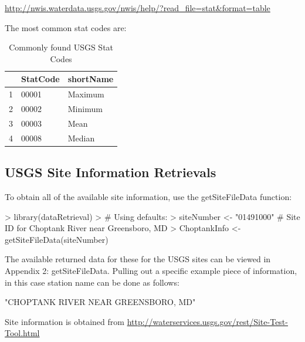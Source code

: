 \documentclass[a4paper,11pt]{article}
\begin{document}
\url{http://nwis.waterdata.usgs.gov/nwis/help/?read_file=stat&format=table}

The most common stat codes are:
\begin{table}[ht]
\begin{center}
\caption{Commonly found USGS Stat Codes}
\begin{tabular}{rll}
  \hline
 & StatCode & shortName \\ 
  \hline
1 & 00001 & Maximum \\ 
  2 & 00002 & Minimum \\ 
  3 & 00003 & Mean \\ 
  4 & 00008 & Median \\ 
   \hline
\end{tabular}
\end{center}
\end{table}

\subsection{USGS Site Information Retrievals}
To obtain all of the available site information, use the getSiteFileData function:
\begin{Schunk}
\begin{Sinput}
> library(dataRetrieval)
> # Using defaults:
> siteNumber <- "01491000" # Site ID for Choptank River near Greensboro, MD
> ChoptankInfo <- getSiteFileData(siteNumber)
\end{Sinput}
\end{Schunk}

The available returned data for these for the USGS sites can be viewed in Appendix 2: getSiteFileData. Pulling out a specific example piece of information, in this case station name can be done as follows:
\begin{Schunk}
\begin{Soutput}
[1] "CHOPTANK RIVER NEAR GREENSBORO, MD"
\end{Soutput}
\end{Schunk}
Site information is obtained from \url{http://waterservices.usgs.gov/rest/Site-Test-Tool.html}

\end{document}

